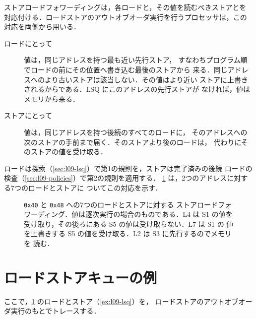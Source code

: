 \documentclass[../main.tex]{subfiles}
\begin{document}
ストアロードフォワーディングは，各ロードと，その値を読むべきストアとを
対応付ける．ロードストアのアウトオブオーダ実行を行うプロセッサは，この
対応を両側から用いる．
\begin{description}
  \item[ロードにとって] 値は，同じアドレスを持つ最も近い先行ストア，
    すなわちプログラム順でロードの前にその位置へ書き込む最後のストアから
    来る．同じアドレスへのより古いストアは該当しない．その値はより近い
    ストアに上書きされるからである．LSQ にこのアドレスの先行ストアが
    なければ，値はメモリから来る．
  \item[ストアにとって] 値は，同じアドレスを持つ後続のすべてのロードに，
    そのアドレスへの次のストアの手前まで届く．そのストアより後のロードは，
    代わりにそのストアの値を受け取る．
\end{description}
ロードは探索（\cref{sec:l09-lsq}）で第1の規則を，ストアは完了済みの後続
ロードの検査（\cref{sec:l09-policies}）で第2の規則を適用する．
\cref{fig:l09-forwarding} は，2つのアドレスに対する7つのロードとストアに
ついてこの対応を示す．

\begin{figure}[htbp]
  \centering
  
  \caption{\texttt{0x40} と \texttt{0x48} への7つのロードとストアに対する
    ストアロードフォワーディング．値は逐次実行の場合のものである．L4 は
    S1 の値を受け取り，その後ろにある S5 の値は受け取らない．L7 は S1 の
    値を上書きする S5 の値を受け取る．L2 は S3 に先行するのでメモリを
    読む．}
  \label{fig:l09-forwarding}
\end{figure}

\section{ロードストアキューの例}
\label{sec:l09-example}

ここで，\cref{fig:l09-forwarding} のロードとストア（\cref{ex:l09-lsq}）を，
ロードストアのアウトオブオーダ実行のもとでトレースする．
\end{document}
